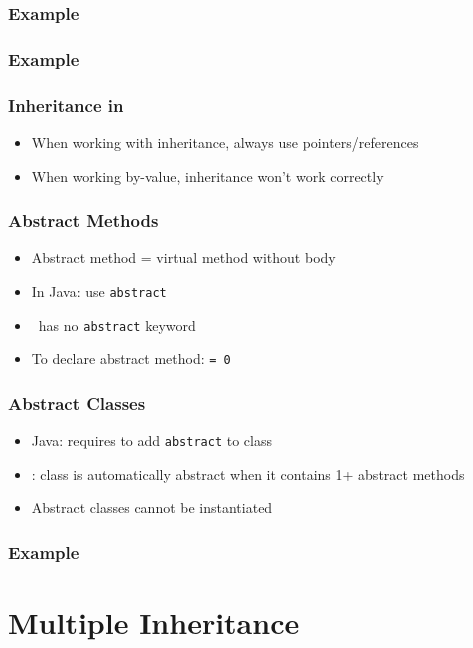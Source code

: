 \documentclass{../ucll-slides}
\begin{document}
\begin{frame}
  \frametitle{Example}
\end{frame}

\begin{frame}
  \frametitle{Example}
\end{frame}

\begin{frame}
  \frametitle{Inheritance in \cpp}
  \begin{itemize}
    \item When working with inheritance, always use pointers/references
    \item When working by-value, inheritance won't work correctly
  \end{itemize}
\end{frame}

\begin{frame}
  \frametitle{Abstract Methods}
  \begin{itemize}
    \item Abstract method = virtual method without body
    \item In Java: use {\tt abstract}
    \item \cpp\ has no {\tt abstract} keyword
    \item To declare abstract method: {\tt = 0}
  \end{itemize}
\end{frame}

\begin{frame}
  \frametitle{Abstract Classes}
  \begin{itemize}
    \item Java: requires to add {\tt abstract} to class
    \item \cpp: class is automatically abstract when it contains 1+ abstract methods
    \item Abstract classes cannot be instantiated
  \end{itemize}
\end{frame}

\begin{frame}
  \frametitle{Example}
\end{frame}

\section{Multiple Inheritance}
\end{document}

